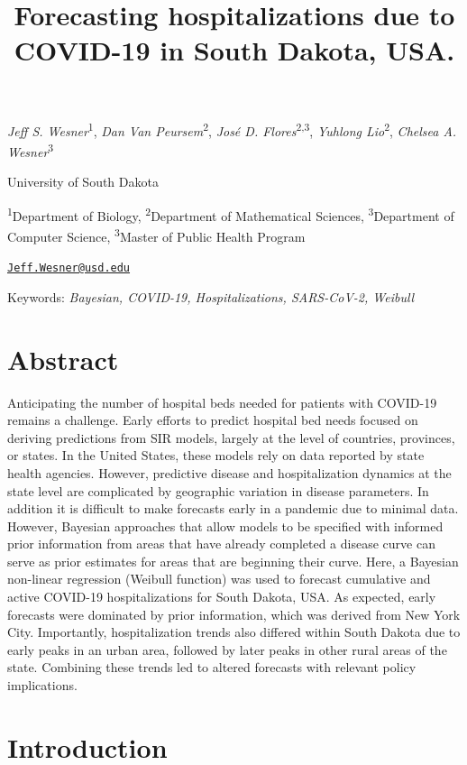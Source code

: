 \documentclass[
]{article}
\title{Forecasting hospitalizations due to COVID-19 in South Dakota, USA.}
\author{}
\date{\vspace{-2.5em}}
\begin{document}
\maketitle

\emph{Jeff S. Wesner}\textsuperscript{1}, \emph{Dan Van Peursem}\textsuperscript{2}, \emph{José D. Flores}\textsuperscript{2,3}, \emph{Yuhlong Lio}\textsuperscript{2}, \emph{Chelsea A. Wesner}\textsuperscript{3}

University of South Dakota

\textsuperscript{1}Department of Biology, \textsuperscript{2}Department of Mathematical Sciences, \textsuperscript{3}Department of Computer Science, \textsuperscript{3}Master of Public Health Program

\href{mailto:Jeff.Wesner@usd.edu}{\nolinkurl{Jeff.Wesner@usd.edu}}

Keywords: \emph{Bayesian, COVID-19, Hospitalizations, SARS-CoV-2, Weibull}

\hypertarget{abstract}{%
\section{Abstract}\label{abstract}}

Anticipating the number of hospital beds needed for patients with COVID-19 remains a challenge. Early efforts to predict hospital bed needs focused on deriving predictions from SIR models, largely at the level of countries, provinces, or states. In the United States, these models rely on data reported by state health agencies. However, predictive disease and hospitalization dynamics at the state level are complicated by geographic variation in disease parameters. In addition it is difficult to make forecasts early in a pandemic due to minimal data. However, Bayesian approaches that allow models to be specified with informed prior information from areas that have already completed a disease curve can serve as prior estimates for areas that are beginning their curve. Here, a Bayesian non-linear regression (Weibull function) was used to forecast cumulative and active COVID-19 hospitalizations for South Dakota, USA. As expected, early forecasts were dominated by prior information, which was derived from New York City. Importantly, hospitalization trends also differed within South Dakota due to early peaks in an urban area, followed by later peaks in other rural areas of the state. Combining these trends led to altered forecasts with relevant policy implications.

\hypertarget{introduction}{%
\section{Introduction}\label{introduction}}
\end{document}
